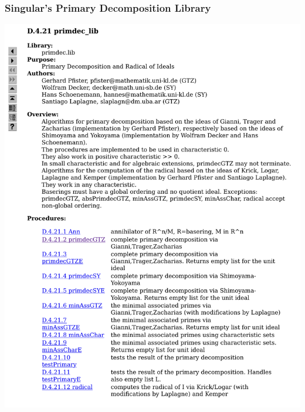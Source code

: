 \documentclass{beamer}
\begin{document}
\begin{frame}
\frametitle{Singular's Primary Decomposition Library}
\includegraphics[page=1, clip, trim=0in 1in 0in 0in, width=\textwidth]{Singular Manual primdec_lib.pdf}
\end{frame}
\end{document}
